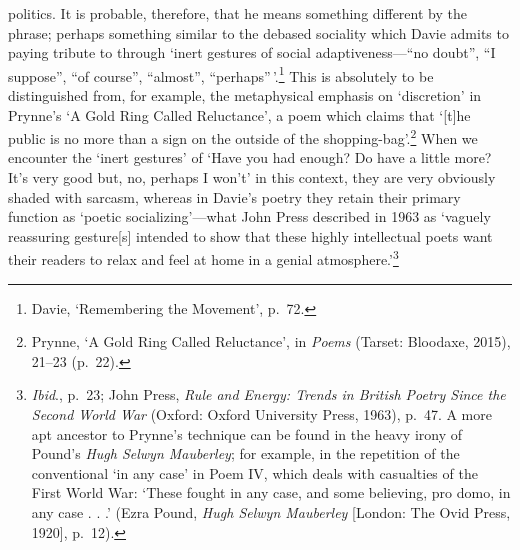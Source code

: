 \documentclass[]{article}
\begin{document}
politics. It is probable, therefore, that he means something different
by the phrase; perhaps something similar to the debased sociality which
Davie admits to paying tribute to through `inert gestures of social
adaptiveness---``no doubt'', ``I suppose'', ``of course'', ``almost'',
``perhaps''\,'.\footnote{Davie, `Remembering the Movement', p.~72.} This
is absolutely to be distinguished from, for example, the metaphysical
emphasis on `discretion' in Prynne's `A Gold Ring Called Reluctance', a
poem which claims that `{[}t{]}he public \textbar{} is no more than a
sign on the outside of the \textbar{} shopping-bag'.\footnote{Prynne, `A
  Gold Ring Called Reluctance', in \emph{Poems} (Tarset: Bloodaxe,
  2015), 21--23 (p.~22).} When we encounter the `inert gestures' of
`Have \textbar{} you had enough? Do have a little more? \textbar{} It's
very good but, no, perhaps I won't' in this context, they are very
obviously shaded with sarcasm, whereas in Davie's poetry they retain
their primary function as `poetic socializing'---what John Press
described in 1963 as `vaguely reassuring gesture{[}s{]} intended to show
that these highly intellectual poets want their readers to relax and
feel at home in a genial atmosphere.'\footnote{\emph{Ibid}., p.~23; John
  Press, \emph{Rule and Energy: Trends in British Poetry Since the
  Second World War} (Oxford: Oxford University Press, 1963), p.~47. A
  more apt ancestor to Prynne's technique can be found in the heavy
  irony of Pound's \emph{Hugh Selwyn Mauberley}; for example, in the
  repetition of the conventional `in any case' in Poem IV, which deals
  with casualties of the First World War: `These fought in any case,
  \textbar{} and some believing, pro domo, in any case . . .' (Ezra
  Pound, \emph{Hugh Selwyn Mauberley} {[}London: The Ovid Press,
  1920{]}, p.~12).}
\end{document}
